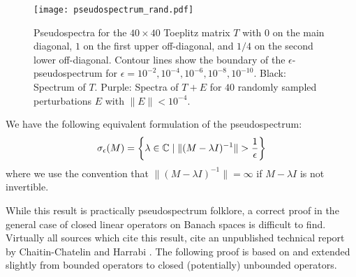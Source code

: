 \begin{figure}
    \centering
    \texttt{[image: pseudospectrum\_rand.pdf]}
    \caption{
        Pseudospectra for the $40 \times 40$ Toeplitz matrix $T$ with $0$ on the main 
        diagonal, $1$ on the first upper off-diagonal, and $1/4$ on the second lower 
        off-diagonal. Contour lines show the boundary of the $\epsilon$-pseudospectrum 
        for $\epsilon = 10^{-2}, 10^{-4}, 10^{-6}, 10^{-8}, 10^{-10}$. Black: Spectrum 
        of $T$. Purple: Spectra of $T + E$ for $40$ randomly sampled 
        perturbations $E$ with $\| E \| < 10^{-4}$. 
    }
\end{figure}

\begin{theorem}
    \label{thm:pseudo}
    We have the following equivalent formulation of the pseudospectrum:
    \begin{equation}
        \sigma_\epsilon (M) = \left\{ \lambda \in \mathbb{C} \mid 
        \| (M - \lambda I)^{-1} \| > \frac{1}{\epsilon} \right\} 
    \end{equation}
    where we use the convention that $\| (M - \lambda I)^{-1} \| = \infty$ if 
    $M - \lambda I$ is not invertible. 
\end{theorem}

\begin{remark}
    While this result is practically pseudospectrum folklore, a correct proof in the general 
    case of closed linear operators on Banach spaces is difficult to find. Virtually all 
    sources which cite this result, cite an unpublished technical report by Chaitin-Chatelin 
    and Harrabi \cite{unpublished_pseudospectrum_result}. The following proof is based on 
    \cite{boettcher2005spectral} and extended slightly from bounded operators to closed 
    (potentially) unbounded operators. 
\end{remark}

